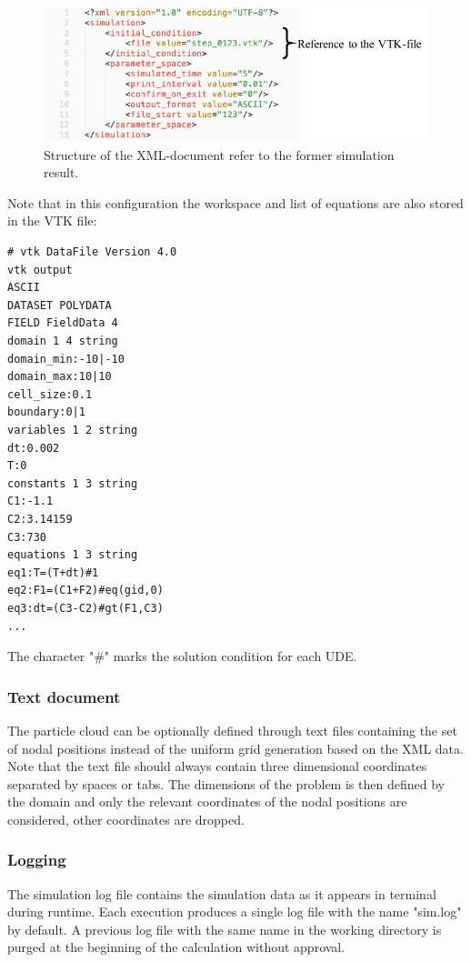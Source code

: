 \documentclass[a4paper,12pt,openany]{book}
\theoremstyle{break}
\begin{document}
\begin{figure}[h!]
  \includegraphics[scale=1]{xml_intro_simple.pdf}
  \centering
  \caption{Structure of the XML-document refer to the former simulation result.}
  \label{fig:xml_intro_simple}
\end{figure}\vspace*{3pt}
\newpage
Note that in this configuration the workspace and list of equations are also stored in the VTK file:\\
\begin{lstlisting}
# vtk DataFile Version 4.0
vtk output
ASCII
DATASET POLYDATA
FIELD FieldData 4
domain 1 4 string
domain_min:-10|-10
domain_max:10|10
cell_size:0.1
boundary:0|1
variables 1 2 string
dt:0.002
T:0
constants 1 3 string
C1:-1.1
C2:3.14159
C3:730
equations 1 3 string
eq1:T=(T+dt)#1
eq2:F1=(C1+F2)#eq(gid,0)
eq3:dt=(C3-C2)#gt(F1,C3)
...
\end{lstlisting}
The character "\#" marks the solution condition for each UDE.
\subsubsection{Text document}
The particle cloud can be optionally defined through text files containing the set of nodal positions instead of the uniform grid generation based on the XML data. Note that the text file should always contain three dimensional coordinates separated by spaces or tabs. The dimensions of the problem is then defined by the domain and only the relevant coordinates of the nodal positions are considered, other coordinates are dropped.
\subsubsection{Logging}
The simulation log file contains the simulation data as it appears in terminal during runtime. Each execution produces a single log file with the name "sim.log" by default. A previous log file with the same name in the working directory is purged at the beginning of the calculation without approval.
\end{document}
